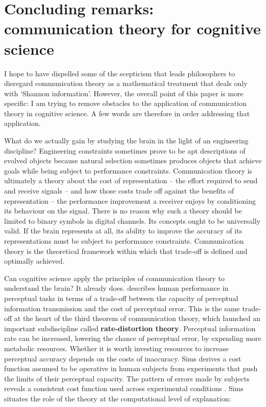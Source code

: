 \section{\sloppy Concluding remarks: communication theory for cognitive science}\label{sec:conclusion}

I hope to have dispelled some of the scepticism that leads philosophers to disregard communication theory as a mathematical treatment that deals only with `Shannon information'.
However, the overall point of this paper is more specific: I am trying to remove obstacles to the application of communication theory in cognitive science.
A few words are therefore in order addressing that application.

What do we actually gain by studying the brain in the light of an engineering discipline?
Engineering constraints sometimes prove to be apt descriptions of evolved objects because natural selection sometimes produces objects that achieve goals while being subject to performance constraints.
Communication theory is ultimately a theory about the cost of representation -- the effort required to send and receive signals -- and how those costs trade off against the benefits of representation -- the performance improvement a receiver enjoys by conditioning its behaviour on the signal.
There is no reason why such a theory should be limited to binary symbols in digital channels.
Its concepts ought to be universally valid.
If the brain represents at all, its ability to improve the accuracy of its representations must be subject to performance constraints.
Communication theory is the theoretical framework within which that trade-off is defined and optimally achieved.

Can cognitive science apply the principles of communication theory to understand the brain?
It already does.
\citet{sims2016ratedistortion} describes human performance in perceptual tasks in terms of a trade-off between the capacity of perceptual information transmission and the cost of perceptual error.
This is the same trade-off at the heart of the third theorem of communication theory, which launched an important subdiscipline called \textbf{rate-distortion theory}.
Perceptual information rate can be increased, lowering the chance of perceptual error, by expending more metabolic resources.
Whether it is worth investing resources to increase perceptual accuracy depends on the costs of inaccuracy.
Sims derives a cost function assumed to be operative in human subjects from experiments that push the limits of their perceptual capacity.
The pattern of errors made by subjects reveals a consistent cost function used across experimental conditions \citep[188]{sims2016ratedistortion}.
Sims situates the role of the theory at the computational level of explanation:

